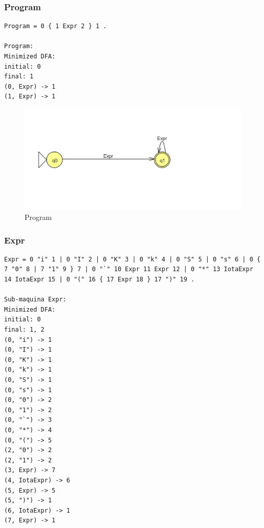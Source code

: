 \subsubsection{Program}

\begin{lstlisting}
Program = 0 { 1 Expr 2 } 1 .

Program: 
Minimized DFA: 
initial: 0
final: 1
(0, Expr) -> 1
(1, Expr) -> 1       
\end{lstlisting}

\begin{figure}[H]
\centering
\includegraphics[width=12cm,keepaspectratio]{jflap-automatas/program.png}
\caption{\label{fig:jflap-program} Program}
\end{figure}

\subsubsection{Expr}

\begin{lstlisting}  
Expr = 0 "i" 1 | 0 "I" 2 | 0 "K" 3 | 0 "k" 4 | 0 "S" 5 | 0 "s" 6 | 0 { 7 "0" 8 | 7 "1" 9 } 7 | 0 "`" 10 Expr 11 Expr 12 | 0 "*" 13 IotaExpr 14 IotaExpr 15 | 0 "(" 16 { 17 Expr 18 } 17 ")" 19 .
                   
Sub-maquina Expr: 
Minimized DFA: 
initial: 0
final: 1, 2
(0, "i") -> 1
(0, "I") -> 1
(0, "K") -> 1
(0, "k") -> 1
(0, "S") -> 1
(0, "s") -> 1
(0, "0") -> 2
(0, "1") -> 2
(0, "`") -> 3
(0, "*") -> 4
(0, "(") -> 5
(2, "0") -> 2
(2, "1") -> 2
(3, Expr) -> 7
(4, IotaExpr) -> 6
(5, Expr) -> 5
(5, ")") -> 1
(6, IotaExpr) -> 1
(7, Expr) -> 1
\end{lstlisting}

